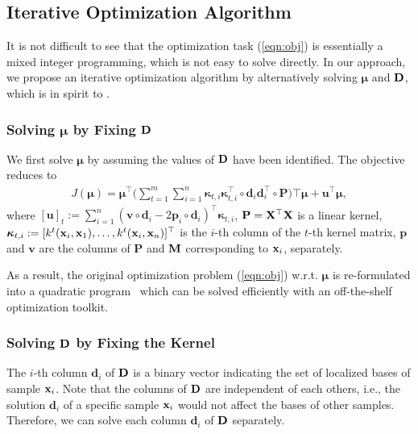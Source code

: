 \subsection{Iterative Optimization Algorithm}

It is not difficult to see that the optimization task (\ref{eqn:obj}) is essentially a mixed integer programming, which is not easy to solve directly. In our approach, we propose an iterative optimization algorithm by alternatively solving $\bm\mu$ and ${\mathbf D}$, which is in spirit to \cite{icml/TanWT10}.

\subsubsection{Solving $\bm\mu$ by Fixing ${\mathbf D}$}

We first solve $\bm\mu$ by assuming the values of ${\mathbf D}$ have been identified. The objective reduces to
\begin{eqnarray}
J(\bm\mu) = \bm\mu^\top\bigg(  \sum_{t=1}^m \sum_{i=1}^n\bm\kappa_{t,i}\bm\kappa_{t,i}^\top\circ\mathbf d_i\mathbf d_i^\top\circ\mathbf P              \bigg)\top\bm\mu + \mathbf u^\top\bm\mu,
\end{eqnarray}
where $[\mathbf u]_t:= \sum_{i=1}^n(\mathbf v\circ\mathbf d_i - 2\mathbf p_i\circ\mathbf d_i)^\top\bm\kappa_{t,i}$, $\mathbf P = {\mathbf X}^\top{\mathbf X}$ is a linear kernel, $\boldsymbol{\kappa}_{t,i} :=[k^t(\mathbf{x}_i,\mathbf{x}_1),\ldots,k^t(\mathbf{x}_i,\mathbf{x}_n)]^\top$ is the $i$-th column of the $t$-th kernel matrix,  $\mathbf p$ and $\mathbf v$ are the columns of $\mathbf P$ and ${\bf M}$ corresponding to $\mathbf{x}_i$, separately.

As a result, the original optimization problem (\ref{eqn:obj}) w.r.t. $\bm\mu$ is re-formulated into a quadratic program~\cite{Boyd} which can be solved efficiently with an off-the-shelf optimization toolkit.

\subsubsection{Solving ${\mathbf D}$ by Fixing the Kernel} %

The $i$-th column $\mathbf d_i$ of ${\mathbf D}$ is a binary vector indicating the set of localized bases of sample $\mathbf{x}_i$. Note that the columns of ${\mathbf D}$ are independent of each others, i.e., the solution $\mathbf d_i$ of a specific sample $\mathbf{x}_i$ would not affect the bases of other samples. Therefore, we can solve each column $\mathbf d_i$ of ${\mathbf D}$ separately.

